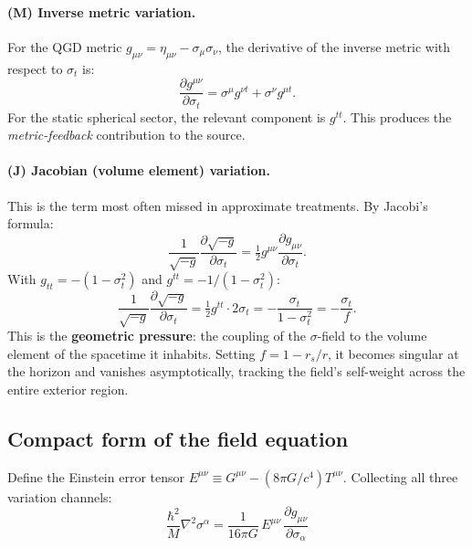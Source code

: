 \documentclass[11pt,a4paper]{article}
\theoremstyle{plain}
\theoremstyle{definition}
\theoremstyle{remark}
\newcommand{\sigt}{\sigma_t}
\newcommand{\half}{\tfrac{1}{2}}
\begin{document}
\paragraph{(M) Inverse metric variation.}
For the QGD metric $g_{\mu\nu} = \eta_{\mu\nu} - \sigma_\mu\sigma_\nu$, the
derivative of the inverse metric with respect to $\sigt$ is:
\begin{equation}
  \frac{\partial g^{\mu\nu}}{\partial\sigt}
  = \sigma^\mu g^{\nu t} + \sigma^\nu g^{\mu t}.
  \label{eq:dginv}
\end{equation}
For the static spherical sector, the relevant component is $g^{tt}$.  This produces the
\emph{metric-feedback} contribution to the source.

\paragraph{(J) Jacobian (volume element) variation.}
This is the term most often missed in approximate treatments.  By Jacobi's formula:
\begin{equation}
  \frac{1}{\sqrt{-g}}\frac{\partial\sqrt{-g}}{\partial\sigt}
  = \half g^{\mu\nu}\frac{\partial g_{\mu\nu}}{\partial\sigt}.
  \label{eq:jacobi}
\end{equation}
With $g_{tt} = -(1-\sigt^2)$ and $g^{tt} = -1/(1-\sigt^2)$:
\begin{equation}
  \frac{1}{\sqrt{-g}}\frac{\partial\sqrt{-g}}{\partial\sigt}
  = \half g^{tt}\cdot 2\sigt = -\frac{\sigt}{1-\sigt^2} = -\frac{\sigt}{f}.
  \label{eq:jac_val}
\end{equation}
This is the \textbf{geometric pressure}: the coupling of the $\sigma$-field to the volume
element of the spacetime it inhabits.  Setting $f = 1 - r_s/r$, it becomes singular
at the horizon and vanishes asymptotically, tracking the field's self-weight across
the entire exterior region.

\subsection{Compact form of the field equation}

Define the Einstein error tensor $E^{\mu\nu} \equiv G^{\mu\nu} - (8\pi G/c^4)T^{\mu\nu}$.
Collecting all three variation channels:
\begin{equation}
  \boxed{\frac{\hbar^2}{M}\nabla^2\sigma^\alpha
  = \frac{1}{16\pi G}\,E^{\mu\nu}\,\frac{\partial g_{\mu\nu}}{\partial\sigma_\alpha}}
  \label{eq:compact}
\end{equation}
\end{document}

